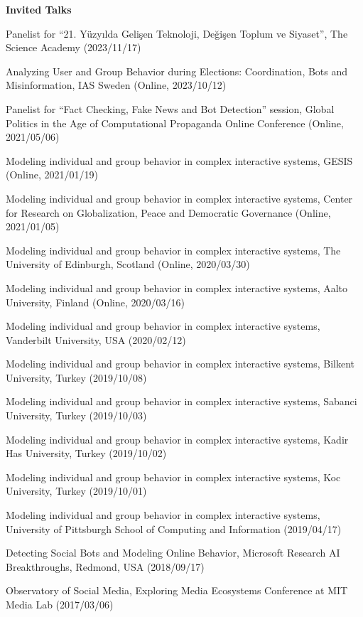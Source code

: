 \documentclass[10pt]{article}
\newenvironment{innerlist}[1][\enskip\textbullet]%
        {\begin{compactitem}[#1]}{\end{compactitem}}
\begin{document}
\vspace{3mm}
\textbf{Invited Talks}
\begin{innerlist}
\item Panelist for ``21. Yüzyılda Gelişen Teknoloji, Değişen Toplum ve Siyaset'', The Science Academy (2023/11/17)
\item Analyzing User and Group Behavior during Elections: Coordination, Bots and Misinformation, IAS Sweden (Online, 2023/10/12)
\item Panelist for ``Fact Checking, Fake News and Bot Detection'' session, Global Politics in the Age of Computational Propaganda Online Conference (Online, 2021/05/06)
\item Modeling individual and group behavior in complex interactive systems, GESIS (Online, 2021/01/19)
\item Modeling individual and group behavior in complex interactive systems, Center for Research on Globalization, Peace and Democratic Governance (Online, 2021/01/05)
\item Modeling individual and group behavior in complex interactive systems, The University of Edinburgh, Scotland (Online, 2020/03/30)
\item Modeling individual and group behavior in complex interactive systems, Aalto University, Finland (Online, 2020/03/16)
\item Modeling individual and group behavior in complex interactive systems, Vanderbilt University, USA (2020/02/12)
\item Modeling individual and group behavior in complex interactive systems, Bilkent University, Turkey (2019/10/08)
\item Modeling individual and group behavior in complex interactive systems, Sabanci University, Turkey (2019/10/03)
\item Modeling individual and group behavior in complex interactive systems, Kadir Has University, Turkey (2019/10/02)
\item Modeling individual and group behavior in complex interactive systems, Koc University, Turkey (2019/10/01)
\item Modeling individual and group behavior in complex interactive systems, University of Pittsburgh School of Computing and Information (2019/04/17)
\item Detecting Social Bots and Modeling Online Behavior, Microsoft Research AI Breakthroughs, Redmond, USA (2018/09/17)
\item Observatory of Social Media, Exploring Media Ecosystems Conference at MIT Media Lab (2017/03/06)

\end{innerlist}
\end{document}
